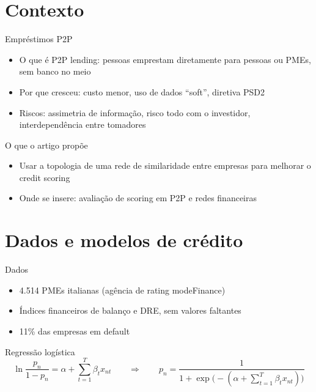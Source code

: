 
\section{Contexto}

\begin{frame}{Empréstimos P2P}
  \begin{itemize}
    \item O que é P2P lending: pessoas emprestam diretamente para pessoas ou PMEs, sem banco no meio
    \item Por que cresceu: custo menor, uso de dados ``soft'', diretiva PSD2
    \item Riscos: assimetria de informação, risco todo com o investidor, interdependência entre tomadores
  \end{itemize}
\end{frame}

\begin{frame}{O que o artigo propõe}
  \begin{itemize}
    \item Usar a topologia de uma rede de similaridade entre empresas para melhorar o credit scoring
    \item Onde se insere: avaliação de scoring em P2P e redes financeiras
  \end{itemize}
\end{frame}

\section{Dados e modelos de crédito}

\begin{frame}{Dados}
  \begin{itemize}
    \item 4.514 PMEs italianas (agência de rating modeFinance)
    \item Índices financeiros de balanço e DRE, sem valores faltantes
    \item 11\% das empresas em default
  \end{itemize}
\end{frame}

\begin{frame}{Regressão logística}
  \[
    \ln\frac{p_n}{1-p_n} = \alpha + \sum_{t=1}^{T} \beta_t x_{nt}
    \qquad\Longrightarrow\qquad
    p_n = \frac{1}{1 + \exp\!\big(-(\alpha + \sum_{t=1}^{T} \beta_t x_{nt})\big)}
  \]
\end{frame}

